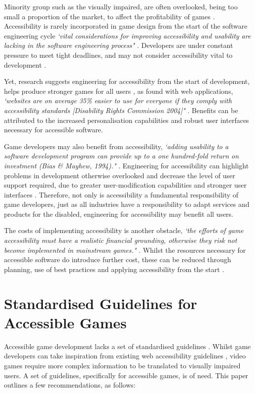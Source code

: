 \documentclass{scrartcl}
\begin{document}
Minority group such as the visually impaired, are often overlooked, being too small a proportion of the market, to affect the profitability of games \cite{16}. Accessibility is rarely incorporated in game design from the start of the software engineering cycle \textit{`vital considerations for improving accessibility and usability are lacking in the software engineering process"} \cite{15}. Developers are under constant pressure to meet tight deadlines, and may not consider accessibility vital to development \cite{3} \cite{10}. 

Yet, research suggests engineering for accessibility from the start of development, helps produce stronger games for all users \cite{5}, as found with web applications, \textit{`websites are on average 35\% easier to use for everyone if they comply with accessibility standards [Disability Rights Commission 2004]"} \cite{5}. Benefits can be attributed to the increased personalisation capabilities and robust user interfaces necessary for accessible software. 

Game developers may also benefit from accessibility, \textit{`adding usability to a software development program can provide up to a one hundred-fold return on investment (Bias \& Mayhew, 1994)."} \cite{17} \cite{20}. Engineering for accessibility can highlight problems in development otherwise overlooked and decrease the level of user support required, due to greater user-modification capabilities and stronger user interfaces \cite{17}. Therefore, not only is accessibility a fundamental responsibility of game developers, just as all industries have a responsibility to adapt services and products for the disabled, engineering for accessibility may benefit all users. 

The costs of implementing accessibility is another obstacle, \textit{`the efforts of game accessibility must have a realistic financial grounding, otherwise they risk not become implemented in mainstream games."} \cite{14}. Whilst the resources necessary for accessible software do introduce further cost, these can be reduced through planning, use of best practices and applying accessibility from the start \cite{17}. 

\section{Standardised Guidelines for Accessible Games}

Accessible game development lacks a set of standardised guidelines \cite{18}. Whilst game developers can take inspiration from existing web accessibility guidelines \cite{18}, video games require more complex information to be translated to visually impaired users. A set of guidelines, specifically for accessible games, is of need. This paper outlines a few recommendations, as follows:
\end{document}
